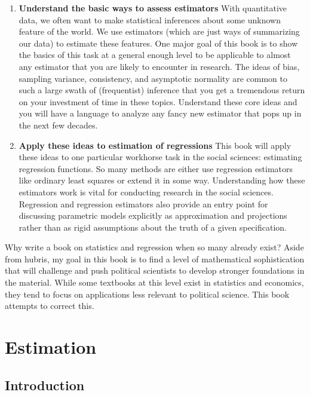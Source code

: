 \documentclass[
  letterpaper,
  DIV=11,
  numbers=noendperiod]{scrreprt}
\theoremstyle{definition}
\theoremstyle{plain}
\theoremstyle{definition}
\theoremstyle{remark}
\begin{document}
\begin{enumerate}
\def\labelenumi{\arabic{enumi}.}
\item
  \textbf{Understand the basic ways to assess estimators} With
  quantitative data, we often want to make statistical inferences about
  some unknown feature of the world. We use estimators (which are just
  ways of summarizing our data) to estimate these features. One major
  goal of this book is to show the basics of this task at a general
  enough level to be applicable to almost any estimator that you are
  likely to encounter in research. The ideas of bias, sampling variance,
  consistency, and asymptotic normality are common to such a large swath
  of (frequentist) inference that you get a tremendous return on your
  investment of time in these topics. Understand these core ideas and
  you will have a language to analyze any fancy new estimator that pops
  up in the next few decades.
\item
  \textbf{Apply these ideas to estimation of regressions} This book will
  apply these ideas to one particular workhorse task in the social
  sciences: estimating regression functions. So many methods are either
  use regression estimators like ordinary least squares or extend it in
  some way. Understanding how these estimators work is vital for
  conducting research in the social sciences. Regression and regression
  estimators also provide an entry point for discussing parametric
  models explicitly as approximation and projections rather than as
  rigid assumptions about the truth of a given specification.
\end{enumerate}

Why write a book on statistics and regression when so many already
exist? Aside from hubris, my goal in this book is to find a level of
mathematical sophistication that will challenge and push political
scientists to develop stronger foundations in the material. While some
textbooks at this level exist in statistics and economics, they tend to
focus on applications less relevant to political science. This book
attempts to correct this.


\hypertarget{estimation}{%
\chapter{Estimation}\label{estimation}}

\hypertarget{introduction-1}{%
\section{Introduction}\label{introduction-1}}
\end{document}
